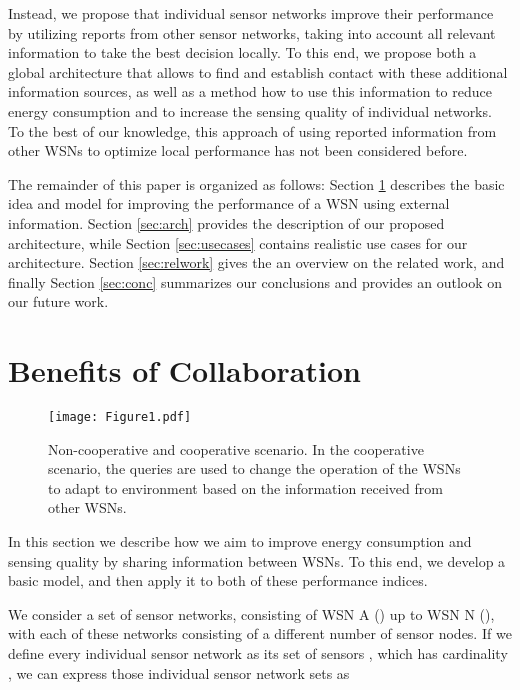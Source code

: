 \documentclass[onecolumn]{jaise2e}
\begin{document}
Instead, we propose that individual sensor networks improve their performance by utilizing reports from other sensor networks, taking into account all relevant information to take the best decision locally. To this end, we propose both a global architecture that allows to find and establish contact with these additional information sources, as well as a method how to use this information to reduce energy consumption and to increase the sensing quality of individual networks. To the best of our knowledge, this approach of using reported information from other WSNs to optimize local performance has not been considered before.

The remainder of this paper is organized as follows: Section \ref{sec:benefits} describes the basic idea and model for improving the performance of a WSN using external information. Section \ref{sec:arch} provides the description of our proposed architecture, while Section \ref{sec:usecases} contains realistic use cases for our architecture. Section \ref{sec:relwork} gives the an overview on the related work, and finally Section \ref{sec:conc} summarizes our conclusions and provides an outlook on our future work.



\section{Benefits of Collaboration}\label{sec:benefits}

\begin{figure*}[t]
\centering
\texttt{[image: Figure1.pdf]}  
\caption{Non-cooperative and cooperative scenario. In the cooperative scenario, the queries are used to change the operation of the WSNs to adapt to environment based on the information received from other WSNs.}
\label{fig:Scenario}
\end{figure*}


In this section we describe how we aim to improve energy consumption and sensing quality by sharing information between WSNs. To this end, we develop a basic model, and then apply it to both of these performance indices.

We consider a set of sensor networks, consisting of WSN A () up to WSN N (), with each of these networks consisting of a different number of sensor nodes. If we define every individual sensor network  as its set of sensors , which has cardinality , we can express those individual sensor network sets as 
\end{document}

